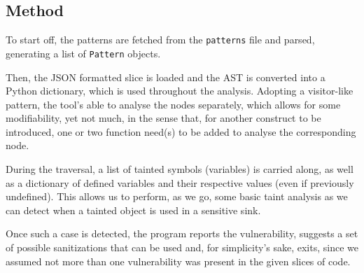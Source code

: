\subsection*{Method}
\label{sec:experimental.method}

To start off, the patterns are fetched from the \verb|patterns| file and parsed,
generating a list of \verb|Pattern| objects.

Then, the JSON formatted slice is loaded and the AST is converted into a Python
dictionary, which is used throughout the analysis. Adopting a visitor-like
pattern, the tool's able to analyse the nodes separately, which allows for some
modifiability, yet not much, in the sense that, for another construct to be
introduced, one or two function need(s) to be added to analyse the corresponding
node.

During the traversal, a list of tainted symbols (variables) is carried along, as
well as a dictionary of defined variables and their respective values (even if
previously undefined). This allows us to perform, as we go, some basic taint
analysis as we can detect when a tainted object is used in a sensitive sink.

Once such a case is detected, the program reports the vulnerability, suggests
a set of possible sanitizations that can be used and, for simplicity's sake,
exits, since we assumed not more than one vulnerability was present in the given
slices of code.
